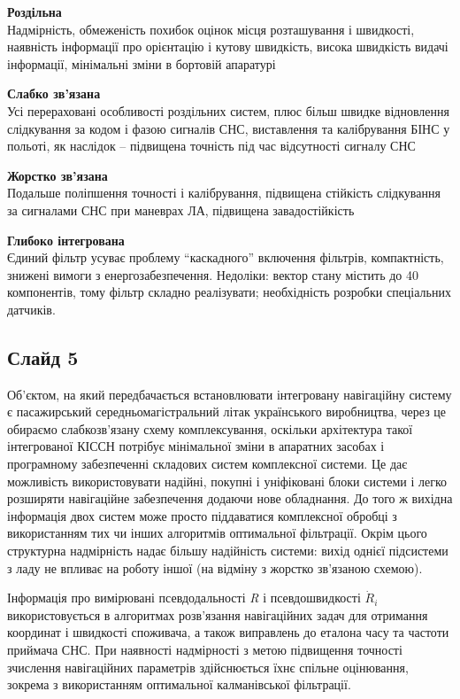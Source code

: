 \documentclass[ukrainian,utf8,simple,floatsubsection, hpadding=1mm,equationsubsection,]{eskdtext}
\begin{document}
\textbf{Роздільна}\\
Надмірність, обмеженість похибок оцінок місця розташування і швидкості, наявність інформації про орієнтацію і кутову швидкість, висока швидкість видачі інформації, мінімальні зміни в бортовій апаратурі

\textbf{Слабко зв'язана}\\
Усі перераховані особливості роздільних систем, плюс більш швидке відновлення слідкування за кодом і фазою сигналів СНС, виставлення та калібрування БІНС у польоті, як наслідок -- підвищена точність під час відсутності сигналу СНС

\textbf{Жорстко зв'язана}\\
Подальше поліпшення точності і калібрування, підвищена стійкість слідкування за сигналами СНС при маневрах ЛА, підвищена завадостійкість 

\textbf{Глибоко інтегрована}\\
Єдиний фільтр усуває проблему ``каскадного'' включення 
фільтрів, компактність, знижені вимоги з енергозабезпечення. Недоліки: вектор стану 
містить до 40 компонентів, тому фільтр складно реалізувати; необхідність розробки спеціальних датчиків.
\subsection*{Слайд 5}

Об'єктом, на який передбачається встановлювати інтегровану навігаційну систему є пасажирський середньомагістральний літак українського виробництва, через це обираємо  слабкозв’язану схему комплексування, оскільки архітектура такої інтегрованої КІССН потрібує мінімальної зміни в апаратних засобах і програмному забезпеченні складових систем комплексної системи. Це дає можливість використовувати надійні, покупні і уніфіковані блоки системи і легко розширяти навігаційне забезпечення додаючи нове обладнання. До того ж вихідна інформація двох систем може просто піддаватися комплексної обробці з використанням тих чи інших алгоритмів оптимальної фільтрації. Окрім цього структурна надмірність надає більшу надійність системи: вихід однієї підсистеми з ладу не впливає на роботу іншої (на відміну з жорстко зв’язаною схемою).

Інформація про вимірювані псевдодальності \textit{R} і псевдошвидкості $\dot{R}_{i} $ використовується 
в алгоритмах розв'язання навігаційних задач для отримання координат і швидкості споживача, 
а також виправлень до еталона часу та частоти приймача СНС. При наявності надмірності 
з метою підвищення точності зчислення навігаційних параметрів здійснюється їхнє спільне 
оцінювання, зокрема з використанням оптимальної калманівської  фільтрації. 
\end{document}
